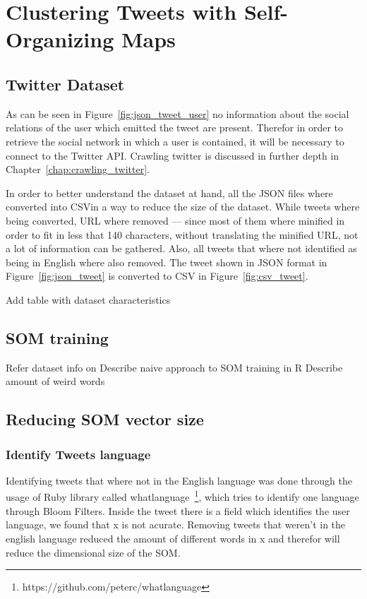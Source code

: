 
\section{Clustering Tweets with Self-Organizing Maps}
\label{ch:clustering_tweets}

\subsection{Twitter Dataset}
\label{subsec:twitter_dataset}

As can be seen in Figure~\ref{fig:json_tweet_user} no information about the social relations of the user which emitted the tweet are present. Therefor in order to retrieve the social network in which a user is contained, it will be necessary to connect to the Twitter API. Crawling twitter is discussed in further depth in Chapter~\ref{chap:crawling_twitter}.  


In order to better understand the dataset at hand, all the \ac{JSON} files where converted into \ac{CSV}in a way to reduce the size of the dataset. While tweets where being converted, \ac{URL} where removed --- since most of them where minified in order to fit in less that 140 characters, without translating the minified URL, not a lot of information can be gathered. Also, all tweets that where not identified as being in English where also removed. The tweet shown in \ac{JSON} format in Figure~\ref{fig:json_tweet} is converted to \ac{CSV} in Figure~\ref{fig:csv_tweet}.


{\color{red} Add table with dataset characteristics }


\subsection{SOM training}
\label{sub:clustering_tweets_with_soms}
{\color{red} Refer dataset info on }
{\color{red} Describe naive approach to SOM training in R }
{\color{red} Describe amount of weird words }

\subsection{Reducing SOM vector size}
\label{sub:reducing_som_vector_size}

\subsubsection{Identify Tweets language}
\label{ssub:identify_tweets_lang}
Identifying tweets that where not in the English language was done through the usage of Ruby library called whatlanguage~\footnote{https://github.com/peterc/whatlanguage}, which tries to identify one language through Bloom Filters. Inside the tweet there is a field which identifies the user language, we found that x is not acurate. Removing tweets that weren't in the english language reduced the amount of different words in x and therefor will reduce the dimensional size of the \ac{SOM}.

